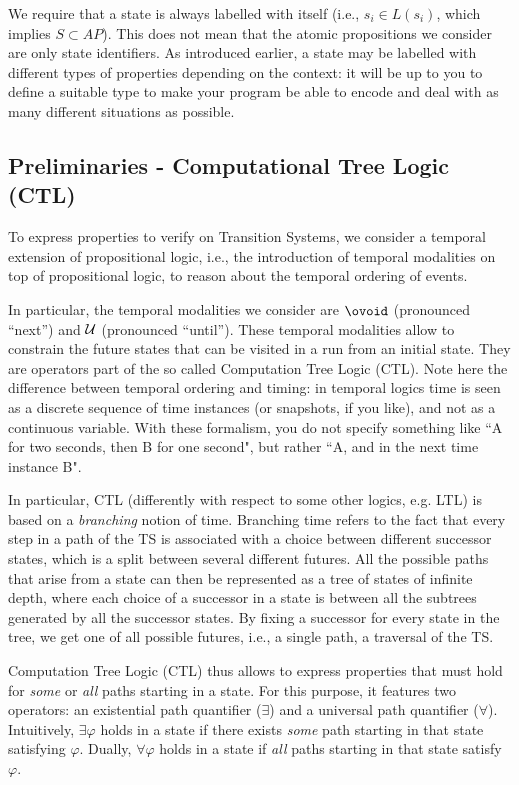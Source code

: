 \documentclass{article}
\begin{document}
We require that a state is always labelled with itself 
(i.e., $s_i \in L(s_i)$, which implies $S \subset AP$). 
This does not mean that the atomic propositions we consider are only state identifiers. 
As introduced earlier, a state may be labelled with different types of properties depending on the context: 
it will be up to you to define a suitable type to make your program be able to encode and 
deal with as many different situations as possible.

\subsection{Preliminaries - Computational Tree Logic (CTL)}
\label{subsec-ctl}

To express properties to verify on Transition Systems, we consider a temporal extension of propositional logic, 
i.e., the introduction of temporal modalities on top of propositional logic, to reason about the temporal ordering
of events.

In particular, the temporal modalities we consider are $\ovoid$ (pronounced ``next'') 
and $\mathbin{\mathcal{U}}$ (pronounced ``until''). These temporal modalities allow to constrain the future states 
that can be visited in a run from an initial state. They are operators part of the so called Computation Tree Logic (CTL).
Note here the difference between temporal ordering and timing: in temporal logics time is seen as a discrete sequence of time instances 
(or snapshots, if you like), and not as a continuous variable. With these formalism, 
you do not specify something like ``A for two seconds, then B for one second", but rather ``A, and in the next time instance B".

In particular, CTL (differently with respect to some other logics, e.g. LTL) is based on a \emph{branching} notion of time. 
Branching time refers to the fact that every step in a path of the TS is associated with a choice between 
different successor states, which is a split between several different futures. 
All the possible paths that arise from a state can then be represented
as a tree of states of infinite depth, where each choice of a successor in a state is between all the subtrees generated by all the successor states.
By fixing a successor for every state in the tree, we get one of all possible futures, 
i.e., a single path, a traversal of the TS.

Computation Tree Logic (CTL) thus allows to express properties that must hold for \emph{some} or \emph{all} paths starting in a state. 
For this purpose, it features two operators: an existential path quantifier ($\exists$) and a universal path quantifier ($\forall$). 
Intuitively, $\exists \varphi$ holds in a state if there exists \emph{some} path starting in that state satisfying $\varphi$. 
Dually, $\forall \varphi$ holds in a state if \emph{all} paths starting in that state satisfy $\varphi$.
\end{document}
